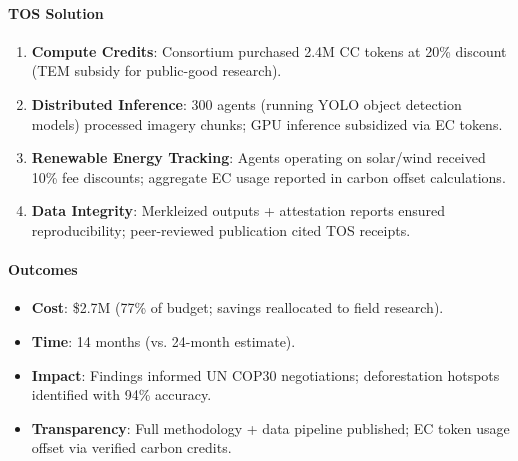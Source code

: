 \documentclass[11pt]{article}
\begin{document}
\begin{itemize}[noitemsep]
\begin{itemize}[noitemsep]
\begin{itemize}[noitemsep]
\begin{itemize}[noitemsep]
\begin{itemize}[noitemsep]
\begin{itemize}[noitemsep]
\paragraph{TOS Solution}
\begin{enumerate}[noitemsep]
  \item \textbf{Compute Credits}: Consortium purchased 2.4M CC tokens at 20\% discount (TEM subsidy for public-good research).
  \item \textbf{Distributed Inference}: 300 agents (running YOLO object detection models) processed imagery chunks; GPU inference subsidized via EC tokens.
  \item \textbf{Renewable Energy Tracking}: Agents operating on solar/wind received 10\% fee discounts; aggregate EC usage reported in carbon offset calculations.
  \item \textbf{Data Integrity}: Merkleized outputs + attestation reports ensured reproducibility; peer-reviewed publication cited TOS receipts.
\end{enumerate}

\paragraph{Outcomes}
\begin{itemize}[noitemsep]
  \item \textbf{Cost}: \$2.7M (77\% of budget; savings reallocated to field research).
  \item \textbf{Time}: 14 months (vs. 24-month estimate).
  \item \textbf{Impact}: Findings informed UN COP30 negotiations; deforestation hotspots identified with 94\% accuracy.
  \item \textbf{Transparency}: Full methodology + data pipeline published; EC token usage offset via verified carbon credits.
\end{itemize}


\end{itemize}
\end{itemize}
\end{itemize}
\end{itemize}
\end{itemize}
\end{itemize}
\end{document}
